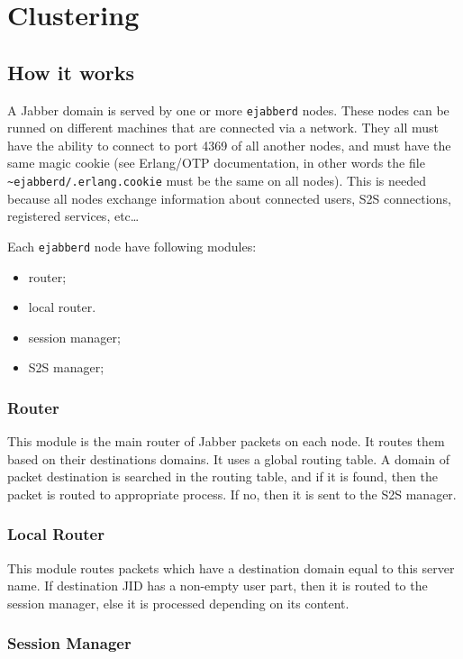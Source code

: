 \documentclass[a4paper,10pt]{article}
\newcommand{\term}[1]{\texttt{#1}}
\newcommand{\ejabberd}{\texttt{ejabberd}}
\newcommand{\Jabber}{Jabber}
\begin{document}
\section{Clustering}
\label{sec:clustering}


\subsection{How it works}
\label{sec:howitworks}

A \Jabber{} domain is served by one or more \ejabberd{} nodes.  These nodes can
be runned on different machines that are connected via a network.  They all
must have the ability to connect to port 4369 of all another nodes, and must
have the same magic cookie (see Erlang/OTP documentation, in other words the
file \term{\~{}ejabberd/.erlang.cookie} must be the same on all nodes). This is
needed because all nodes exchange information about connected users, S2S
connections, registered services, etc\ldots

Each \ejabberd{} node have following modules:
\begin{itemize}
\item router;
\item local router.
\item session manager;
\item S2S manager;
\end{itemize}


\subsubsection{Router}

This module is the main router of \Jabber{} packets on each node.  It
routes them based on their destinations domains.  It uses a global
routing table.  A domain of packet destination is searched in the
routing table, and if it is found, then the packet is routed to
appropriate process.  If no, then it is sent to the S2S manager.


\subsubsection{Local Router}

This module routes packets which have a destination domain equal to
this server name.  If destination JID has a non-empty user part, then
it is routed to the session manager, else it is processed depending on
its content.


\subsubsection{Session Manager}
\end{document}
